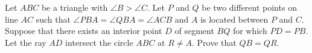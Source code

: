 Let 
$ABC$
 be a triangle with 
$\angle B > \angle C$.
 Let 
$P$
 and 
$Q$
 be two different points on line 
$AC$
 such that 
$\angle PBA = \angle QBA = \angle ACB $
 and 
$A$
 is located between 
$P$
 and 
$C$.
 Suppose that there exists an interior point 
$D$
 of segment 
$BQ$
 for which 
$PD=PB$.
 Let the ray 
$AD$
 intersect the circle 
$ABC$
 at 
$R \neq A$.
 Prove that 
$QB = QR$.
